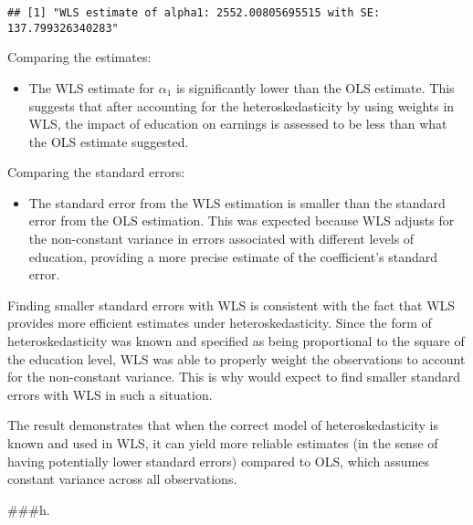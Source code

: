 \documentclass[
]{article}
\providecommand{\tightlist}{%
  \setlength{\itemsep}{0pt}\setlength{\parskip}{0pt}}
\begin{document}
\begin{verbatim}
## [1] "WLS estimate of alpha1: 2552.00805695515 with SE: 137.799326340283"
\end{verbatim}

Comparing the estimates:

\begin{itemize}
\tightlist
\item
  The WLS estimate for \(\alpha_1\) is significantly lower than the OLS
  estimate. This suggests that after accounting for the
  heteroskedasticity by using weights in WLS, the impact of education on
  earnings is assessed to be less than what the OLS estimate suggested.
\end{itemize}

Comparing the standard errors:

\begin{itemize}
\tightlist
\item
  The standard error from the WLS estimation is smaller than the
  standard error from the OLS estimation. This was expected because WLS
  adjusts for the non-constant variance in errors associated with
  different levels of education, providing a more precise estimate of
  the coefficient's standard error.
\end{itemize}

Finding smaller standard errors with WLS is consistent with the fact
that WLS provides more efficient estimates under heteroskedasticity.
Since the form of heteroskedasticity was known and specified as being
proportional to the square of the education level, WLS was able to
properly weight the observations to account for the non-constant
variance. This is why would expect to find smaller standard errors with
WLS in such a situation.

The result demonstrates that when the correct model of
heteroskedasticity is known and used in WLS, it can yield more reliable
estimates (in the sense of having potentially lower standard errors)
compared to OLS, which assumes constant variance across all
observations.

\#\#\#h.
\end{document}
